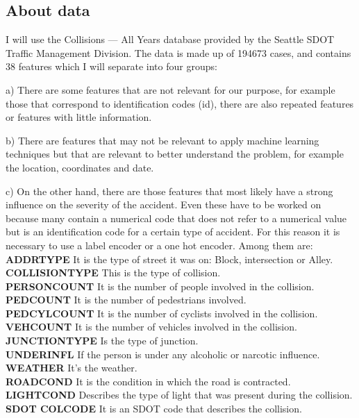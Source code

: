 \documentclass[12pt]{article}
\begin{document}
\subsection*{About data}
I will use the Collisions — All Years database provided by the Seattle SDOT Traffic Management Division. The data is made up of 194673 cases, and contains 38 features which I will separate into four groups:

a) There are some features that are not relevant for our purpose, for example those that correspond to identification codes (id), there are also repeated features or features with little information.

b) There are features that may not be relevant to apply machine learning techniques but that are relevant to better understand the problem, for example the location, coordinates and date.

c) On the other hand, there are those features that most likely have a strong influence on the severity of the accident. Even these have to be worked on because many contain a numerical code that does not refer to a numerical value but is an identification code for a certain type of accident. For this reason it is necessary to use a label encoder or a one hot encoder. Among them are: \\

\textbf{ADDRTYPE} It is the type of street it was on: Block, intersection or Alley. \\
\textbf{COLLISIONTYPE} This is the type of collision. \\
\textbf{PERSONCOUNT} It is the number of people involved in the collision. \\
\textbf{PEDCOUNT} It is the number of pedestrians involved. \\
\textbf{PEDCYLCOUNT} It is the number of cyclists involved in the collision. \\
\textbf{VEHCOUNT} It is the number of vehicles involved in the collision. \\
\textbf{JUNCTIONTYPE} Is the type of junction. \\
\textbf{UNDERINFL} If the person is under any alcoholic or narcotic influence. \\
\textbf{WEATHER} It's the weather. \\
\textbf{ROADCOND} It is the condition in which the road is contracted. \\
\textbf{LIGHTCOND} Describes the type of light that was present during the collision. \\
\textbf{SDOT COLCODE} It is an SDOT code that describes the collision. \\
\end{document}
